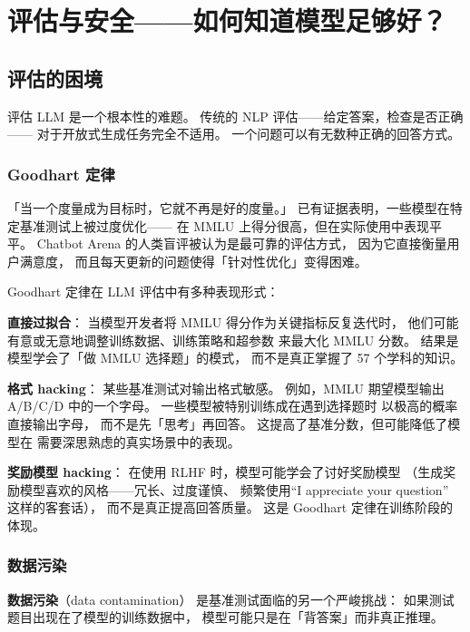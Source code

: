 \chapter{评估与安全——如何知道模型足够好？}
\label{ch:eval}

\section{评估的困境}

评估 LLM 是一个根本性的难题。
传统的 NLP 评估——给定答案，检查是否正确——
对于开放式生成任务完全不适用。
一个问题可以有无数种正确的回答方式。

\subsection{Goodhart 定律}

\begin{warnbox}
「当一个度量成为目标时，它就不再是好的度量。」
已有证据表明，一些模型在特定基准测试上被过度优化——
在 MMLU 上得分很高，但在实际使用中表现平平。
Chatbot Arena 的人类盲评被认为是最可靠的评估方式，
因为它直接衡量用户满意度，
而且每天更新的问题使得「针对性优化」变得困难。
\end{warnbox}

Goodhart 定律在 LLM 评估中有多种表现形式：

\textbf{直接过拟合}：
当模型开发者将 MMLU 得分作为关键指标反复迭代时，
他们可能有意或无意地调整训练数据、训练策略和超参数
来最大化 MMLU 分数。
结果是模型学会了「做 MMLU 选择题」的模式，
而不是真正掌握了 57 个学科的知识。

\textbf{格式 hacking}：
某些基准测试对输出格式敏感。
例如，MMLU 期望模型输出 A/B/C/D 中的一个字母。
一些模型被特别训练成在遇到选择题时
以极高的概率直接输出字母，
而不是先「思考」再回答。
这提高了基准分数，但可能降低了模型在
需要深思熟虑的真实场景中的表现。

\textbf{奖励模型 hacking}：
在使用 RLHF 时，模型可能学会了讨好奖励模型
（生成奖励模型喜欢的风格——冗长、过度谨慎、
频繁使用``I appreciate your question'' 这样的客套话），
而不是真正提高回答质量。
这是 Goodhart 定律在训练阶段的体现。

\subsection{数据污染}
\label{subsec:data-contamination}

\textbf{数据污染}（data contamination）
是基准测试面临的另一个严峻挑战：
如果测试题目出现在了模型的训练数据中，
模型可能只是在「背答案」而非真正推理。

